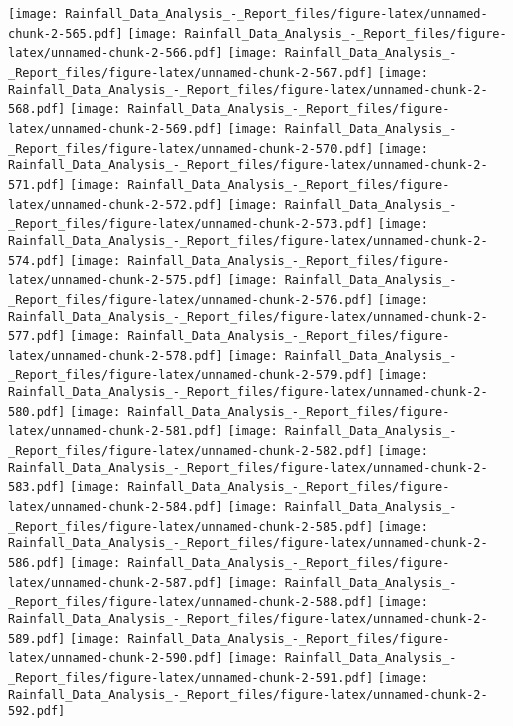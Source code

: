 \documentclass[
]{article}
\begin{document}
\texttt{[image: Rainfall\_Data\_Analysis\_-\_Report\_files/figure-latex/unnamed-chunk-2-565.pdf]}
\texttt{[image: Rainfall\_Data\_Analysis\_-\_Report\_files/figure-latex/unnamed-chunk-2-566.pdf]}
\texttt{[image: Rainfall\_Data\_Analysis\_-\_Report\_files/figure-latex/unnamed-chunk-2-567.pdf]}
\texttt{[image: Rainfall\_Data\_Analysis\_-\_Report\_files/figure-latex/unnamed-chunk-2-568.pdf]}
\texttt{[image: Rainfall\_Data\_Analysis\_-\_Report\_files/figure-latex/unnamed-chunk-2-569.pdf]}
\texttt{[image: Rainfall\_Data\_Analysis\_-\_Report\_files/figure-latex/unnamed-chunk-2-570.pdf]}
\texttt{[image: Rainfall\_Data\_Analysis\_-\_Report\_files/figure-latex/unnamed-chunk-2-571.pdf]}
\texttt{[image: Rainfall\_Data\_Analysis\_-\_Report\_files/figure-latex/unnamed-chunk-2-572.pdf]}
\texttt{[image: Rainfall\_Data\_Analysis\_-\_Report\_files/figure-latex/unnamed-chunk-2-573.pdf]}
\texttt{[image: Rainfall\_Data\_Analysis\_-\_Report\_files/figure-latex/unnamed-chunk-2-574.pdf]}
\texttt{[image: Rainfall\_Data\_Analysis\_-\_Report\_files/figure-latex/unnamed-chunk-2-575.pdf]}
\texttt{[image: Rainfall\_Data\_Analysis\_-\_Report\_files/figure-latex/unnamed-chunk-2-576.pdf]}
\texttt{[image: Rainfall\_Data\_Analysis\_-\_Report\_files/figure-latex/unnamed-chunk-2-577.pdf]}
\texttt{[image: Rainfall\_Data\_Analysis\_-\_Report\_files/figure-latex/unnamed-chunk-2-578.pdf]}
\texttt{[image: Rainfall\_Data\_Analysis\_-\_Report\_files/figure-latex/unnamed-chunk-2-579.pdf]}
\texttt{[image: Rainfall\_Data\_Analysis\_-\_Report\_files/figure-latex/unnamed-chunk-2-580.pdf]}
\texttt{[image: Rainfall\_Data\_Analysis\_-\_Report\_files/figure-latex/unnamed-chunk-2-581.pdf]}
\texttt{[image: Rainfall\_Data\_Analysis\_-\_Report\_files/figure-latex/unnamed-chunk-2-582.pdf]}
\texttt{[image: Rainfall\_Data\_Analysis\_-\_Report\_files/figure-latex/unnamed-chunk-2-583.pdf]}
\texttt{[image: Rainfall\_Data\_Analysis\_-\_Report\_files/figure-latex/unnamed-chunk-2-584.pdf]}
\texttt{[image: Rainfall\_Data\_Analysis\_-\_Report\_files/figure-latex/unnamed-chunk-2-585.pdf]}
\texttt{[image: Rainfall\_Data\_Analysis\_-\_Report\_files/figure-latex/unnamed-chunk-2-586.pdf]}
\texttt{[image: Rainfall\_Data\_Analysis\_-\_Report\_files/figure-latex/unnamed-chunk-2-587.pdf]}
\texttt{[image: Rainfall\_Data\_Analysis\_-\_Report\_files/figure-latex/unnamed-chunk-2-588.pdf]}
\texttt{[image: Rainfall\_Data\_Analysis\_-\_Report\_files/figure-latex/unnamed-chunk-2-589.pdf]}
\texttt{[image: Rainfall\_Data\_Analysis\_-\_Report\_files/figure-latex/unnamed-chunk-2-590.pdf]}
\texttt{[image: Rainfall\_Data\_Analysis\_-\_Report\_files/figure-latex/unnamed-chunk-2-591.pdf]}
\texttt{[image: Rainfall\_Data\_Analysis\_-\_Report\_files/figure-latex/unnamed-chunk-2-592.pdf]}
\end{document}
